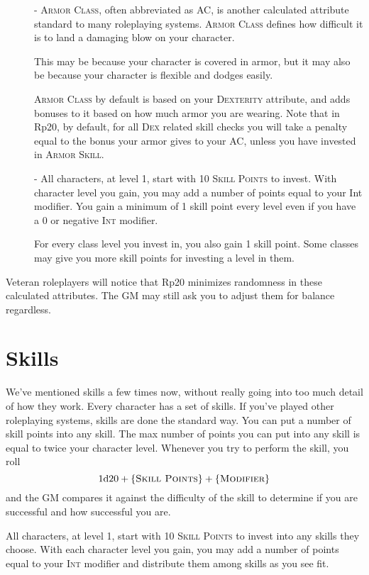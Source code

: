 \begin{description}
	\item[] - \textsc{Armor Class}, often abbreviated as AC, is another calculated attribute standard to many roleplaying systems. \textsc{Armor Class} defines how difficult it is to land a damaging blow on your character.
	
	This may be because your character is covered in armor, but it may also be because your character is flexible and dodges easily.
	
	\textsc{Armor Class} by default is based on your \textsc{Dexterity} attribute, and adds bonuses to it based on how much armor you are wearing. Note that in Rp20, by default, for all \textsc{Dex} related skill checks you will take a penalty equal to the bonus your armor gives to your AC, unless you have invested in \textsc{Armor Skill}.
	
	\item[] - All characters, at level 1, start with 10 \textsc{Skill Points} to invest. With character level you gain, you may add a number of points equal to your Int modifier. You gain a minimum of 1 skill point every level even if you have a 0 or negative \textsc{Int} modifier.
	
	For every class level you invest in, you also gain 1 skill point. Some classes may give you more skill points for investing a level in them.
\end{description}

Veteran roleplayers will notice that Rp20 minimizes randomness in these calculated attributes. The GM may still ask you to adjust them for balance regardless.

\section{Skills}
We've mentioned skills a few times now, without really going into too much detail of how they work. Every character has a set of skills. If you’ve played other roleplaying systems, skills are done the standard way. You can put a number of skill points into any skill. The max number of points you can put into any skill is equal to twice your character level. Whenever you try to perform the skill, you roll $$1\mathrm{d}20 + \{ \textsc{Skill Points} \} + \{ \textsc{Modifier} \}$$ and the GM compares it against the difficulty of the skill to determine if you are successful and how successful you are.

All characters, at level 1, start with 10 \textsc{Skill Points} to invest into any skills they choose. With each character level you gain, you may add a number of points equal to your \textsc{Int} modifier and distribute them among skills as you see fit.

